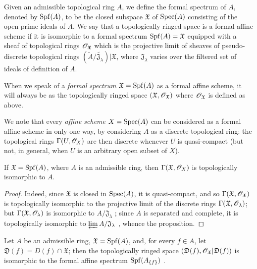 \begin{definition}[10.1.2]
\label{1.10.1.2}
Given an admissible topological ring $A$, we define the formal spectrum of $A$, denoted by $\operatorname{Spf}(A)$, to be the closed subspace $\mathfrak{X}$ of $\operatorname{Spec}(A)$ consisting of the open prime ideals of $A$.
We say that a topologically ringed space is a formal affine scheme if it is isomorphic to a formal spectrum $\operatorname{Spf}(A)=\mathfrak{X}$ equipped with a sheaf of topological rings $\mathscr{O}_\mathfrak{X}$ which is the projective limit of sheaves of pseudo-discrete topological rings $(\widetilde{A}/\widetilde{\mathfrak{J}_\lambda})|\mathfrak{X}$, where $\mathfrak{J}_\lambda$ varies over the filtered set of ideals of definition of $A$.
\end{definition}

When we speak of a \emph{formal spectrum $\mathfrak{X}=\operatorname{Spf}(A)$} as a formal affine scheme, it will always be as the topologically ringed space $(\mathfrak{X},\mathscr{O}_\mathfrak{X})$ where $\mathscr{O}_\mathfrak{X}$ is defined as above.

We note that every \emph{affine scheme} $X=\operatorname{Spec}(A)$ can be considered as a formal affine scheme in only one way, by considering $A$ as a discrete topological ring: the topological rings $\Gamma(U,\mathscr{O}_X)$ are then discrete whenever $U$ is quasi-compact (but not, in general, when $U$ is an arbitrary open subset of $X$).

\begin{proposition}[10.1.3]
\label{1.10.1.3}
If $\mathfrak{X}=\operatorname{Spf}(A)$, where $A$ is an admissible ring, then $\Gamma(\mathfrak{X},\mathscr{O}_X)$ is topologically isomorphic to $A$.
\end{proposition}

\begin{proof}
\label{proof-1.10.1.3}
Indeed, since $\mathfrak{X}$ is closed in $\operatorname{Spec}(A)$, it is quasi-compact, and so $\Gamma(\mathfrak{X},\mathscr{O}_\mathfrak{X})$ is topologically isomorphic to the projective limit of the discrete rings $\Gamma(\mathfrak{X},\mathscr{O}_\lambda)$; but $\Gamma(\mathfrak{X},\mathscr{O}_\lambda)$ is isomorphic to $A/\mathfrak{J}_\lambda$ ; since $A$ is separated and complete, it is topologically isomorphic to $\varprojlim A/\mathfrak{J}_\lambda$ , whence the proposition.
\end{proof}

\begin{proposition}[10.1.4]
\label{1.10.1.4}
Let $A$ be an admissible ring, $\mathfrak{X}=\operatorname{Spf}(A)$, and, for every $f\in A$, let $\mathfrak{D}(f)=D(f)\cap\mathfrak{X}$; then the topologically ringed space $(\mathfrak{D}(f),\mathscr{O}_\mathfrak{X}|\mathfrak{D}(f))$ is isomorphic to the formal affine spectrum $\operatorname{Spf}(A_{\{f\}})$ .
\end{proposition}

